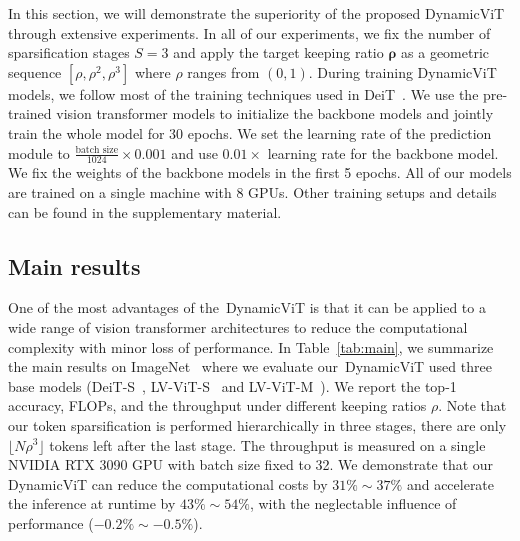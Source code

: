 \documentclass{article}
\newcommand{\dynamvit}{DynamicViT}
\begin{document}
\begin{table}[t]
{\begin{tabu}
    \end{tabu}}
  \label{tab:main}\end{table}In this section, we will demonstrate the superiority of the proposed \dynamvit{} through extensive experiments. In all of our experiments, we fix the number of sparsification stages $S=3$ and apply the target keeping ratio $\bm{\rho}$ as a geometric sequence $[\rho, \rho^2, \rho^3]$ where $\rho$ ranges from $(0, 1)$. During training DynamicViT models, we follow most of the training techniques used in DeiT~\cite{touvron2020deit}. We use the pre-trained vision transformer models to initialize the backbone models  and jointly train the whole model for 30 epochs. We set the learning rate of the prediction module to $\frac{\text{batch size}}{1024}\times 0.001$ and use $0.01\times$ learning rate for the backbone model. We fix the weights of the backbone models in the first 5 epochs. All of our models are trained on a single machine with 8 GPUs. Other training setups and details can be found in the supplementary material.


\subsection{Main results} One of the most advantages of the~\dynamvit{} is that it can be applied to a wide range of vision transformer architectures to reduce the computational complexity with minor loss of performance. In Table~\ref{tab:main}, we summarize the main results on ImageNet~\cite{deng2009imagenet} where we evaluate our~\dynamvit{} used three base models (DeiT-S~\cite{touvron2020deit}, LV-ViT-S~\cite{jiang2021token} and LV-ViT-M~\cite{jiang2021token}). We report the top-1 accuracy, FLOPs, and the throughput under different keeping ratios $\rho$. Note that our token sparsification is performed hierarchically in three stages, there are only $\lfloor N\rho^3\rfloor$ tokens left after the last stage. The throughput is measured on a single NVIDIA RTX 3090 GPU with batch size fixed to 32. We demonstrate that our \dynamvit{} can reduce the computational costs by $31\%\sim 37\%$ and accelerate the inference at runtime by $43\%\sim 54\%$, with the neglectable influence of performance ($-0.2\%\sim -0.5\%$).
\end{document}
